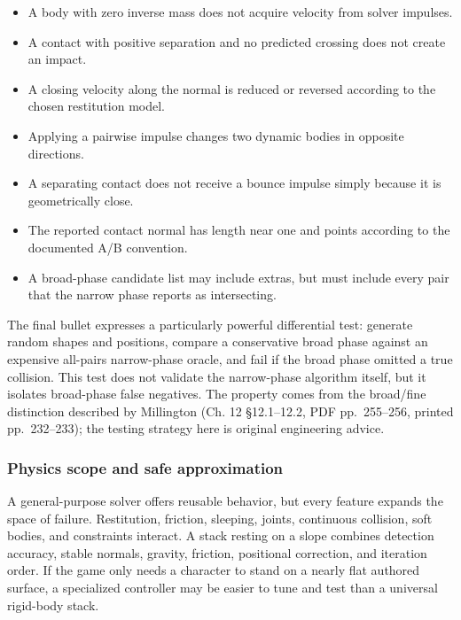 \begin{itemize}
\tightlist
\item
  A body with zero inverse mass does not acquire velocity from solver impulses.
\item
  A contact with positive separation and no predicted crossing does not create an impact.
\item
  A closing velocity along the normal is reduced or reversed according to the chosen restitution model.
\item
  Applying a pairwise impulse changes two dynamic bodies in opposite directions.
\item
  A separating contact does not receive a bounce impulse simply because it is geometrically close.
\item
  The reported contact normal has length near one and points according to the documented A/B convention.
\item
  A broad-phase candidate list may include extras, but must include every pair that the narrow phase reports as intersecting.
\end{itemize}

The final bullet expresses a particularly powerful differential test: generate random shapes and positions, compare a conservative broad phase against an expensive all-pairs narrow-phase oracle, and fail if the broad phase omitted a true collision. This test does not validate the narrow-phase algorithm itself, but it isolates broad-phase false negatives. The property comes from the broad/fine distinction described by Millington (Ch. 12 §12.1--12.2, PDF pp.~255--256, printed pp.~232--233); the testing strategy here is original engineering advice.

\subsubsection{Physics scope and safe approximation}\label{06-engine-ii-ch033-physics-scope-and-safe-approximation}

\hypertarget{06-engine-ii-ch033-physics-scope-and-safe-approximation}{}

A general-purpose solver offers reusable behavior, but every feature expands the space of failure. Restitution, friction, sleeping, joints, continuous collision, soft bodies, and constraints interact. A stack resting on a slope combines detection accuracy, stable normals, gravity, friction, positional correction, and iteration order. If the game only needs a character to stand on a nearly flat authored surface, a specialized controller may be easier to tune and test than a universal rigid-body stack.

